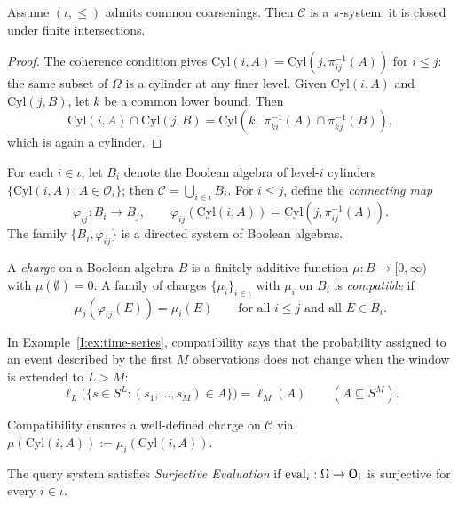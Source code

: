 \begin{lemma}
\label{I:lem:pi-system}
Assume $(\iota, \leq)$ admits common coarsenings.  Then $\mathcal{C}$ is a $\pi$-system: it is closed under finite intersections.
\end{lemma}

\begin{proof}
The coherence condition gives $\mathrm{Cyl}(i, A) = \mathrm{Cyl}(j, \pi_{ij}^{-1}(A))$ for $i \leq j$: the same subset of $\Omega$ is a cylinder at any finer level. Given $\mathrm{Cyl}(i, A)$ and $\mathrm{Cyl}(j, B)$, let $k$ be a common lower bound.  Then
\[
  \mathrm{Cyl}(i, A) \cap \mathrm{Cyl}(j, B)
  = \mathrm{Cyl}(k,\; \pi_{ki}^{-1}(A) \cap \pi_{kj}^{-1}(B)),
\]
which is again a cylinder.
\end{proof}

For each $i \in \iota$, let $B_i$ denote the Boolean algebra of level-$i$ cylinders $\{\mathrm{Cyl}(i, A) : A \in \mathcal{O}_i\}$; then $\mathcal{C} = \bigcup_{i \in \iota} B_i$. For $i \leq j$, define the \emph{connecting map}
\[
  \varphi_{ij} : B_i \to B_j,
  \qquad
  \varphi_{ij}(\mathrm{Cyl}(i, A)) = \mathrm{Cyl}(j, \pi_{ij}^{-1}(A)).
\]
The family $\{B_i, \varphi_{ij}\}$ is a directed system of Boolean algebras.

\begin{definition}
A \emph{charge} on a Boolean algebra $B$ is a finitely additive function $\mu : B \to [0, \infty)$ with $\mu(\emptyset) = 0$.  A family of charges $\{\mu_i\}_{i \in \iota}$ with $\mu_i$ on $B_i$ is \emph{compatible} if
\[
  \mu_j(\varphi_{ij}(E)) = \mu_i(E)
  \qquad \text{for all } i \leq j \text{ and all } E \in B_i.
\]
\end{definition}

\noindent In Example~\ref{I:ex:time-series}, compatibility says that the
probability assigned to an event described by the first $M$ observations
does not change when the window is extended to $L > M$:
\[
  \ell_L\!\bigl(\{s \in S^L : (s_1,\ldots,s_M) \in A\}\bigr)
  = \ell_M(A)
  \qquad (A \subseteq S^M).
\]

\noindent Compatibility ensures a well-defined charge on $\mathcal{C}$
via $\mu(\mathrm{Cyl}(i, A)) := \mu_i(\mathrm{Cyl}(i, A))$.

\begin{definition}
\label{I:def:eval-surjective}
The query system satisfies \emph{Surjective Evaluation} if $\mathrm{eval}_i : \Omega \to \mathsf{O}_{i}$ is surjective for every $i \in \iota$.
\end{definition}

